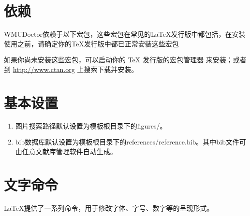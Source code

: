 \section{依赖}
WMUDoctor依赖于以下宏包，这些宏包在常见的\LaTeX{}发行版中都包括，在安装使用之前，请确定你的\TeX{}发行版中都已正常安装这些宏包
\begin{table}[htbp]
    \centering
\end{table}
如果你尚未安装这些宏包，可以启动你的 \TeX{} 发行版的宏包管理器
来安装；或者到 \url{http://www.ctan.org} 上搜索下载并安装。

\section{基本设置}

\begin{enumerate}[label=(\arabic*)]
    \item 图片搜索路径默认设置为模板根目录下的figures/。
    \item bib数据库默认设置为模板根目录下的references/reference.bib。其中bib文件可由任意文献库管理软件自动生成。
\end{enumerate}

\section{文字命令}
\LaTeX 提供了一系列命令，用于修改字体、字号、数字等的呈现形式。

